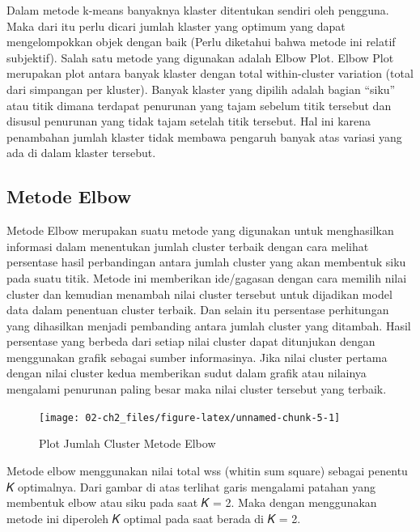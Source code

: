 \documentclass[
  oneside]{book}
\begin{document}
Dalam metode k-means banyaknya klaster ditentukan sendiri oleh pengguna. Maka dari itu perlu dicari jumlah klaster yang optimum yang dapat mengelompokkan objek dengan baik (Perlu diketahui bahwa metode ini relatif subjektif). Salah satu metode yang digunakan adalah Elbow Plot. Elbow Plot merupakan plot antara banyak klaster dengan total within-cluster variation (total dari simpangan per kluster). Banyak klaster yang dipilih adalah bagian ``siku'' atau titik dimana terdapat penurunan yang tajam sebelum titik tersebut dan disusul penurunan yang tidak tajam setelah titik tersebut. Hal ini karena penambahan jumlah klaster tidak membawa pengaruh banyak atas variasi yang ada di dalam klaster tersebut.

\subsection*{Metode Elbow}\label{metode-elbow}

Metode Elbow merupakan suatu metode yang digunakan untuk menghasilkan informasi dalam menentukan jumlah cluster terbaik dengan cara melihat persentase hasil perbandingan antara jumlah cluster yang akan membentuk siku pada suatu titik. Metode ini memberikan ide/gagasan dengan cara memilih nilai cluster dan kemudian menambah nilai cluster tersebut untuk dijadikan model data dalam penentuan cluster terbaik. Dan selain itu persentase perhitungan yang dihasilkan menjadi pembanding antara jumlah cluster yang ditambah. Hasil persentase yang berbeda dari setiap nilai cluster dapat ditunjukan dengan menggunakan grafik sebagai sumber informasinya. Jika nilai cluster pertama dengan nilai cluster kedua memberikan sudut dalam grafik atau nilainya mengalami penurunan paling besar maka nilai cluster tersebut yang terbaik.

\begin{figure}[h]

{\centering \texttt{[image: 02-ch2\_files/figure-latex/unnamed-chunk-5-1]} 

}

\caption{Plot Jumlah Cluster Metode Elbow}\label{fig:unnamed-chunk-5}
\end{figure}

Metode elbow menggunakan nilai total wss (whitin sum square) sebagai penentu 𝐾 optimalnya. Dari gambar di atas terlihat garis mengalami patahan yang membentuk elbow atau siku pada saat 𝐾 = 2. Maka dengan menggunakan metode ini diperoleh 𝐾 optimal pada saat berada di 𝐾 = 2.
\end{document}
